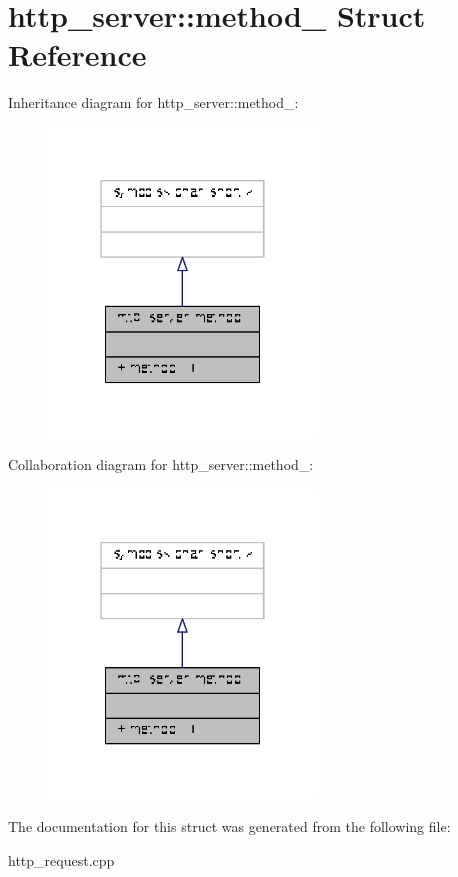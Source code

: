 \hypertarget{structhttp__server_1_1method__}{\section{http\-\_\-server\-:\-:method\-\_\- Struct Reference}
\label{structhttp__server_1_1method__}
}


Inheritance diagram for http\-\_\-server\-:\-:method\-\_\-\-:
\nopagebreak
\begin{figure}[H]
\begin{center}
\leavevmode
\includegraphics[width=202pt]{structhttp__server_1_1method____inherit__graph}
\end{center}
\end{figure}


Collaboration diagram for http\-\_\-server\-:\-:method\-\_\-\-:
\nopagebreak
\begin{figure}[H]
\begin{center}
\leavevmode
\includegraphics[width=202pt]{structhttp__server_1_1method____coll__graph}
\end{center}
\end{figure}


The documentation for this struct was generated from the following file\-:\begin{DoxyCompactItemize}
\item 
http\-\_\-request.\-cpp\end{DoxyCompactItemize}
